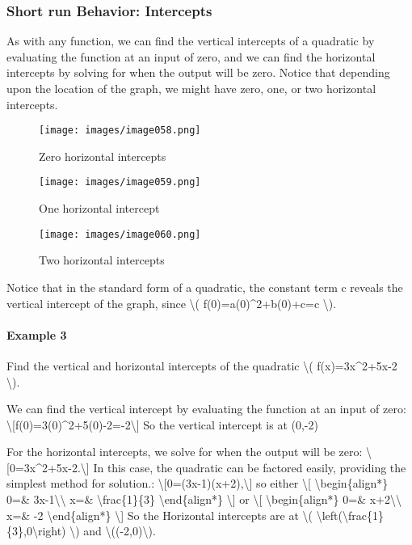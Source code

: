 \hypertarget{short-run-behavior-intercepts}{%
\subsubsection{Short run Behavior:
Intercepts}\label{short-run-behavior-intercepts}}

As with any function, we can find the vertical intercepts of a quadratic
by evaluating the function at an input of zero, and we can find the
horizontal intercepts by solving for when the output will be zero.
Notice that depending upon the location of the graph, we might have
zero, one, or two horizontal intercepts.

\begin{figure}
\centering
\texttt{[image: images/image058.png]}
\caption{Zero horizontal intercepts}
\end{figure}

\begin{figure}
\centering
\texttt{[image: images/image059.png]}
\caption{One horizontal intercept}
\end{figure}

\begin{figure}
\centering
\texttt{[image: images/image060.png]}
\caption{Two horizontal intercepts}
\end{figure}

Notice that in the standard form of a quadratic, the constant term c
reveals the vertical intercept of the graph, since \textbackslash{}(
f(0)=a(0)\^{}2+b(0)+c=c \textbackslash{}).

\hypertarget{example-3}{%
\paragraph{Example 3}\label{example-3}}

Find the vertical and horizontal intercepts of the quadratic
\textbackslash{}( f(x)=3x\^{}2+5x-2 \textbackslash{}).

We can find the vertical intercept by evaluating the function at an
input of zero:
\textbackslash{}{[}f(0)=3(0)\^{}2+5(0)-2=-2\textbackslash{}{]} So the
vertical intercept is at (0,-2)

For the horizontal intercepts, we solve for when the output will be
zero: \textbackslash{}{[}0=3x\^{}2+5x-2.\textbackslash{}{]} In this
case, the quadratic can be factored easily, providing the simplest
method for solution.:
\textbackslash{}{[}0=(3x-1)(x+2),\textbackslash{}{]} so either
\textbackslash{}{[} \textbackslash{}begin\{align*\} 0=\&
3x-1\textbackslash{}\textbackslash{} x=\& \textbackslash{}frac\{1\}\{3\}
\textbackslash{}end\{align*\} \textbackslash{}{]} or \textbackslash{}{[}
\textbackslash{}begin\{align*\} 0=\& x+2\textbackslash{}\textbackslash{}
x=\& -2 \textbackslash{}end\{align*\} \textbackslash{}{]} So the
Horizontal intercepts are at \textbackslash{}(
\textbackslash{}left(\textbackslash{}frac\{1\}\{3\},0\textbackslash{}right)
\textbackslash{}) and \textbackslash{}((-2,0)\textbackslash{}).


